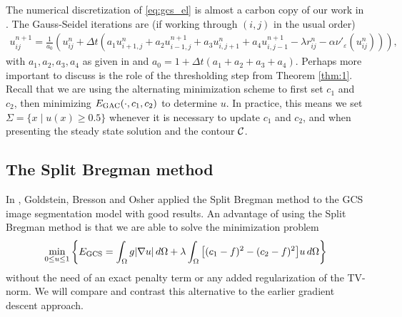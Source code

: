 The numerical discretization of \eqref{eq:gcs_el} is almost a carbon copy of our work in . The Gauss-Seidel iterations are (if working through $(i,j)$ in the usual order)
\begin{align*}
u^{n+1}_{ij} 
= \frac{1}{a_0} 
\left( u^n_{ij} + \Delta t 
\left( a_1 u^n_{i+1,j} + a_2 u^{n+1}_{i-1,j} + a_3 u^{n}_{i,j+1} + a_4 u^{n+1}_{i,j-1}
- \lambda r_{ij}^n
- \alpha \nu'_\varepsilon( u^n_{ij} )
\right)
\right),
\end{align*}
with $a_1,a_2,a_3,a_4$ as given in  and $a_0 = 1 + \Delta t(a_1 + a_2 + a_3 + a_4)$. Perhaps more important to discuss is the role of the thresholding step from Theorem \ref{thm:1}. Recall that we are using the alternating minimization scheme to first set $c_1$ and $c_2$, then minimizing $E_\textrm{GAC}(\cdot, c_1, c_2)$ to determine $u$. In practice, this means we set $\Sigma = \{x \mid u(x) \geq 0.5\}$ whenever it is necessary to update $c_1$ and $c_2$, and when presenting the steady state solution and the contour $\mathcal{C}$.


\subsection{The Split Bregman method}
In \cite{goldstein2010geometric}, Goldstein, Bresson and Osher applied the Split Bregman method \cite{goldstein2009split} to the GCS image segmentation model with good results. An advantage of using the Split Bregman method is that we are able to solve the minimization problem 
\begin{align}
\min_{0 \leq u \leq 1} \left\{ E_\textrm{GCS}  
= \int_{\Omega } g\lvert\nabla u\rvert \,d\Omega 
+ \lambda \int_{\Omega} \big[ (c_1 - f)^2 - (c_2 - f)^2\big] u \,d\Omega
\right\}
\label{eq:egcs1}
\end{align}
without the need of an exact penalty term or any added regularization of the TV-norm. We will compare and contrast this alternative to the earlier gradient descent approach. 

